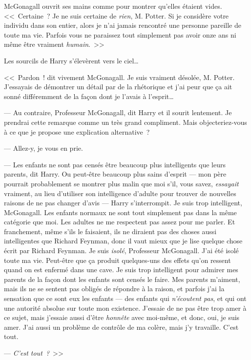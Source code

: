 McGonagall ouvrit ses mains comme pour montrer qu'elles étaient vides. <<~Certaine~? Je ne suis certaine de \emph{rien}, M. Potter. Si je considère votre individu dans son entier, alors je n'ai jamais rencontré une personne pareille de toute ma vie. Parfois vous ne paraissez tout simplement pas avoir onze ans ni même être vraiment \emph{humain}.~>>

Les sourcils de Harry s'élevèrent vers le ciel…

<<~Pardon~! dit vivement McGonagall. Je suis vraiment désolée, M. Potter. J'essayais de démontrer un détail par de la rhétorique et j'ai peur que ça ait sonné différemment de la façon dont je l'avais à l'esprit…

--- Au contraire, Professeur McGonagall, dit Harry et il sourit lentement. Je prendrai cette remarque comme un très grand compliment. Mais objecteriez-vous à ce que je propose une explication alternative~?

--- Allez-y, je vous en prie.

--- Les enfants ne sont pas censés être beaucoup plus intelligents que leurs parents, dit Harry. Ou peut-être beaucoup plus sains d'esprit — mon père pourrait probablement se montrer plus malin que moi s'il, vous savez, \emph{essayait} vraiment, au lieu d'utiliser son intelligence d'adulte pour trouver de nouvelles raisons de ne pas changer d'avis — Harry s'interrompit. Je suis trop intelligent, McGonagall. Les enfants normaux ne sont tout simplement pas dans la même catégorie que moi. Les adultes ne me respectent pas assez pour me parler. Et franchement, même s'ils le faisaient, ils ne diraient pas des choses aussi intelligentes que Richard Feynman, donc il vaut mieux que je lise quelque chose écrit par Richard Feynman. Je suis \emph{isolé}, Professeur McGonagall. J'ai été isolé toute ma vie. Peut-être que ça produit quelques-uns des effets qu'on ressent quand on est enfermé dans une cave. Je suis trop intelligent pour admirer mes parents de la façon dont les enfants sont censés le faire. Mes parents m'aiment, mais ils ne se sentent pas obligés de répondre à la raison, et parfois j'ai la sensation que ce sont eux les enfants — des enfants qui \emph{n'écoutent pas}, et qui ont une autorité absolue sur toute mon existence. J'essaie de ne pas être trop amer à ce sujet, mais j'essaie aussi d'être \emph{honnête} avec moi-même, et donc, oui, je suis amer. J'ai aussi un problème de contrôle de ma colère, mais j'y travaille. C'est tout.

--- \emph{C'est tout~?}~>>

